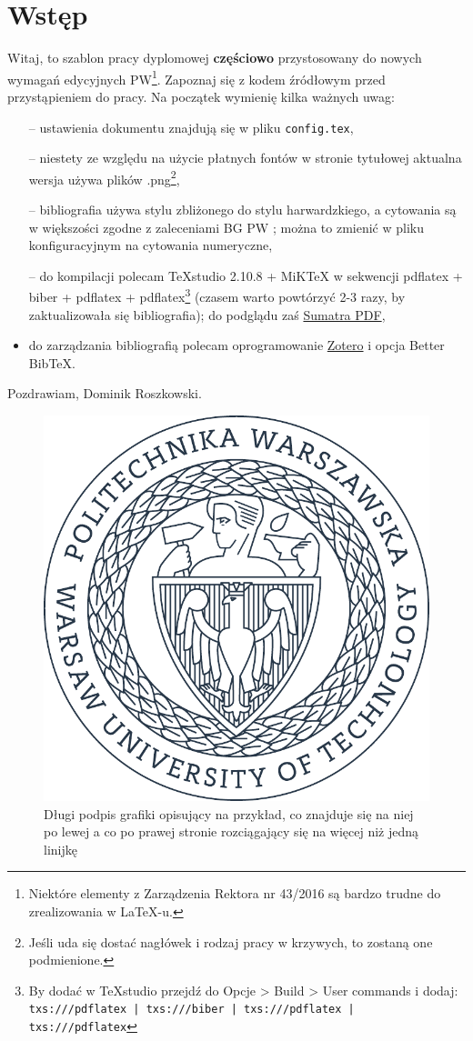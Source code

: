 \chapter{Wstęp}

Witaj, to szablon pracy dyplomowej \textbf{częściowo} przystosowany do nowych wymagań edycyjnych PW\footnote{Niektóre elementy z Zarządzenia Rektora nr 43/2016 są bardzo trudne do zrealizowania w \LaTeX-u.}. Zapoznaj się z kodem źródłowym przed przystąpieniem do pracy. Na początek wymienię kilka ważnych uwag:

\begin{itemize}
	\item[--] ustawienia dokumentu znajdują się w pliku \texttt{config.tex},
	\item[--] niestety ze względu na użycie płatnych fontów w stronie tytułowej aktualna wersja używa plików .png\footnote{Jeśli uda się dostać nagłówek i rodzaj pracy w krzywych, to zostaną one podmienione.},
	\item[--] bibliografia używa stylu zbliżonego do stylu harwardzkiego\parencite{ogata2010modern}, a cytowania są w większości zgodne z zaleceniami BG PW \parencite{linh2002line}; można to zmienić w pliku konfiguracyjnym\parencite[Some kind of post note]{DUMMY:1} na cytowania numeryczne,
	\item[--] do kompilacji polecam TeXstudio 2.10.8 + MiKTeX w sekwencji pdflatex + biber + pdflatex + pdflatex\footnote{By dodać w TeXstudio przejdź do Opcje > Build > User commands i dodaj: \texttt{txs:///pdflatex | txs:///biber | txs:///pdflatex | txs:///pdflatex}} (czasem warto powtórzyć 2-3 razy, by zaktualizowała się bibliografia); do podglądu zaś \href{https://www.sumatrapdfreader.org/}{Sumatra PDF},
	\item do zarządzania bibliografią polecam oprogramowanie \href{https://www.zotero.org/}{Zotero} i opcja Better BibTeX.
\end{itemize}

\begin{flushright}
	Pozdrawiam, Dominik Roszkowski.
\end{flushright}

\begin{figure}[h] %
\centering
\includegraphics[width=0.6\linewidth]{img/PW_logo}
\caption[Krótki podpis grafiki]{Długi podpis grafiki opisujący na przykład, co znajduje się na niej po lewej a co po prawej stronie rozciągający się na więcej niż jedną linijkę}
\label{fig:PW_logo}
\end{figure}

